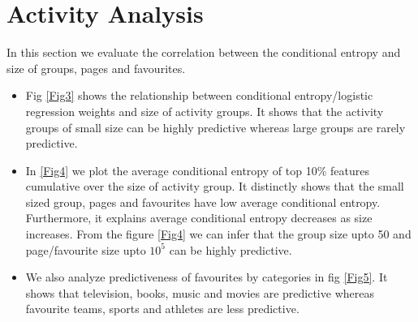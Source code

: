 \section{Activity Analysis}


In this section we evaluate the correlation between the conditional
entropy and size of groups, pages and favourites.
\begin{itemize}
  \item Fig \ref{Fig3} shows the relationship between conditional
    entropy/logistic regression weights and size of activity
    groups. It shows that the activity groups of small size can be
    highly predictive whereas large groups are rarely predictive.
  \item In \ref{Fig4} we plot the average conditional entropy of top
    10\% features cumulative over the size of activity group. It
    distinctly shows that the small sized group, pages and favourites
    have low average conditional entropy. Furthermore, it explains
    average conditional entropy decreases as size increases. From the
    figure \ref{Fig4} we can infer that the group size upto 50 and
    page/favourite size upto $10^{5}$ can be highly predictive.
  \item We also analyze predictiveness of favourites by categories in
    fig \ref{Fig5}. It shows that television, books, music and movies
    are predictive whereas favourite teams, sports and athletes are
    less predictive.
\end{itemize}



